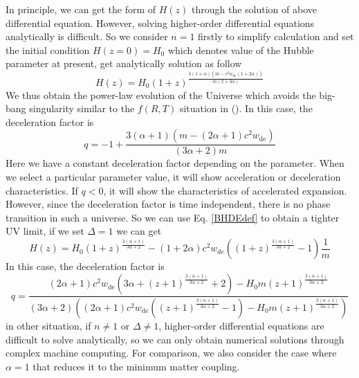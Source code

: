 \documentclass[preprint]{aastex631}
\begin{document}
In principle, we can get the form of $H(z)$ through the solution of above differential equation. However, solving higher-order differential equations analytically is difficult. So we consider $n=1$ firstly to simplify calculation and set the initial condition $H(z=0)=H_0$ which denotes value of the Hubble parameter at present, get analytically solution as follow
\begin{equation}
    H(z)= H_0 (1+z)^{\frac{3 (1+\alpha) \left(m-c^2 w_\text{de}(1+2\alpha)\right)}{m(2+3\alpha)}}
\end{equation}
We thus obtain the power-law evolution of the Universe which avoids the big-bang singularity similar to the $f(R,T)$ situation in (\cite{singhStatefinderDiagnosisHolographic2016}). In this case, the deceleration factor is
\begin{equation}
    q = -1+\frac{3 (\alpha +1) \left(m-(2 \alpha +1) c^2 w_\text{de}\right)}{(3 \alpha +2) m}
\end{equation}
Here we have a constant deceleration factor depending on the parameter. When we select a particular parameter value, it will show acceleration or deceleration characteristics. If $q<0$, it will show the characteristics of accelerated expansion. However, since the deceleration factor is time independent, there is no phase transition in such a universe. So we can use Eq. \eqref{BHDEdef} to obtain a tighter UV limit, if we set $\Delta=1$ we can get 
\begin{equation}
    H(z)= H_0 (1+z)^{\frac{3 (\alpha +1)}{3\alpha +2}}-(1+2 \alpha) c^2 w_{de} \left((1+z)^{\frac{3 (\alpha +1)}{3\alpha +2}}-1\right)\frac{1}{m}
\end{equation}
In this case, the deceleration factor is
\begin{equation}
    q=\frac{(2 \alpha +1) c^2 w_\text{de} \left(3 \alpha +(z+1)^{\frac{3 (\alpha +1)}{3 \alpha +2}}+2\right)-H_0 m (z+1)^{\frac{3 (\alpha +1)}{3 \alpha +2}}}{(3 \alpha +2) \left((2 \alpha +1) c^2 w_\text{de} \left((z+1)^{\frac{3 (\alpha +1)}{3 \alpha +2}}-1\right)-H_0 m (z+1)^{\frac{3 (\alpha +1)}{3 \alpha +2}}\right)}
\end{equation}
in other situation, if $n \neq 1$ or $\Delta \neq 1$, higher-order differential equations are difficult to solve analytically, so we can only obtain numerical solutions through complex machine computing. For comparison, we also consider the case where $\alpha=1$ that reduces it to the minimum matter coupling.
\end{document}

